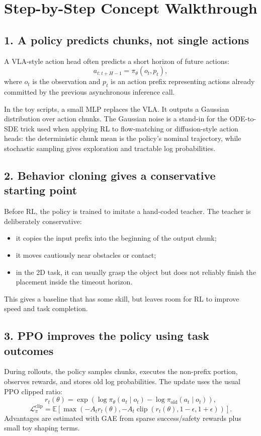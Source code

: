 \documentclass[11pt]{article}
\begin{document}
\section{Step-by-Step Concept Walkthrough}

\subsection{1. A policy predicts chunks, not single actions}

A VLA-style action head often predicts a short horizon of future actions:
\[
a_{t:t+H-1} = \pi_\theta(o_t, p_t),
\]
where \(o_t\) is the observation and \(p_t\) is an action prefix representing actions already committed by the previous asynchronous inference call.

In the toy scripts, a small MLP replaces the VLA. It outputs a Gaussian distribution over action chunks. The Gaussian noise is a stand-in for the ODE-to-SDE trick used when applying RL to flow-matching or diffusion-style action heads: the deterministic chunk mean is the policy's nominal trajectory, while stochastic sampling gives exploration and tractable log probabilities.

\subsection{2. Behavior cloning gives a conservative starting point}

Before RL, the policy is trained to imitate a hand-coded teacher. The teacher is deliberately conservative:
\begin{itemize}[leftmargin=1.5em]
  \item it copies the input prefix into the beginning of the output chunk;
  \item it moves cautiously near obstacles or contact;
  \item in the 2D task, it can usually grasp the object but does not reliably finish the placement inside the timeout horizon.
\end{itemize}

This gives a baseline that has some skill, but leaves room for RL to improve speed and task completion.

\subsection{3. PPO improves the policy using task outcomes}

During rollouts, the policy samples chunks, executes the non-prefix portion, observes rewards, and stores old log probabilities. The update uses the usual PPO clipped ratio:
\[
r_t(\theta) = \exp\left(\log \pi_\theta(a_t \mid o_t) - \log \pi_{\text{old}}(a_t \mid o_t)\right),
\]
\[
\mathcal{L}^{\text{clip}}_{\pi}
= \mathbb{E}\left[
\max\left(-A_t r_t(\theta),
-A_t \operatorname{clip}(r_t(\theta), 1-\epsilon, 1+\epsilon)
\right)
\right].
\]
Advantages are estimated with GAE from sparse success/safety rewards plus small toy shaping terms.
\end{document}

